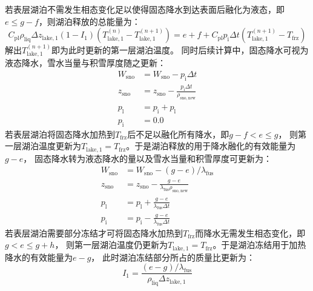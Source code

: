 若表层湖泊不需发生相态变化足以使得固态降水到达表面后融化为液态，即$e\leqslant g-f$，则湖泊释放的总能量为：
\begin{equation}
  C_{\mathrm{p l}} \rho_{\mathrm{liq}} \Delta z_{\mathrm{lake, 1}}\left(1-I_{1}\right)\left(T_{\mathrm{lake, 1}}^{(n)}-T_{\mathrm{lake, 1}}^{(n+1)}\right)=
  e+f+C_{\mathrm{p l}} p_{\mathrm{i}} \Delta t\left(T_{\mathrm{lake, 1}}^{(n+1)}-T_{\mathrm {frz}}\right)
\end{equation}
解出$T_{\mathrm{lake,1}}^{\left(n+1\right)}$即为此时更新的第一层湖泊温度。
同时后续计算中，固态降水可视为液态降水，雪水当量与积雪厚度随之更新：
\begin{equation}
  \begin{aligned}
    W_{\mathrm{sno}} &= W_{\mathrm{sno}}-p_{\mathrm{i}} \Delta t \\
    z_{\mathrm{sno}} &= z_{\mathrm{sno}}-\frac{p_{\mathrm {i}}  \Delta t}{\rho_{\mathrm{sno,new}}} \\
    p_{\mathrm {l}}  &= p_{\mathrm {i}}  + p_{\mathrm {l}}  \\
    p_{\mathrm {i}}  &= 0.0
  \end{aligned}
\end{equation}
若表层湖泊将固态降水加热到$T_{\mathrm {frz}} $后不足以融化所有降水，即$g-f<e\leqslant g$，
则第一层湖泊温度更新为$T_{\mathrm{lake,1}}=T_{\mathrm {frz}} $。于是湖泊释放的用于降水融化的有效能量为$g-e$，
固态降水转为液态降水的量以及雪水当量和积雪厚度可更新为：
\begin{equation}
  \begin{aligned}
    W_{\mathrm{sno}} &= W_{\mathrm{sno}}-(g-e) / \lambda_{\mathrm {fus}} \\
    z_{\mathrm{sno}} &= z_{\mathrm{sno}}-\frac{g-e}{\lambda_{\mathrm {fus}}  \rho_{\mathrm{sno,new}}} \\
    p_{\mathrm{l}} &= p_{\mathrm{l}}+\frac{g-e}{\lambda_{\mathrm {fus}}  \Delta t} \\
    p_{\mathrm{i}} &= p_{\mathrm{i}}-\frac{g-e}{\lambda_{\mathrm {fus}}  \Delta t}
  \end{aligned}
\end{equation}
若表层湖泊需要部分冻结才可将固态降水加热到$T_{\mathrm {frz}} $而降水无需发生相态变化，即$g<e\leqslant g+h$，
则第一层湖泊温度仍更新为$T_{\mathrm{lake,1}}=T_{\mathrm {frz}} $。于是湖泊冻结用于加热降水的有效能量为$e-g$，
此时湖泊冻结部分所占的质量比更新为：
\begin{equation}
  I_{1}=\frac{(e-g) / \lambda_{\mathrm {fus}}}{\rho_{\mathrm{liq}} \Delta z_{\mathrm{lake, 1}}}
\end{equation}

